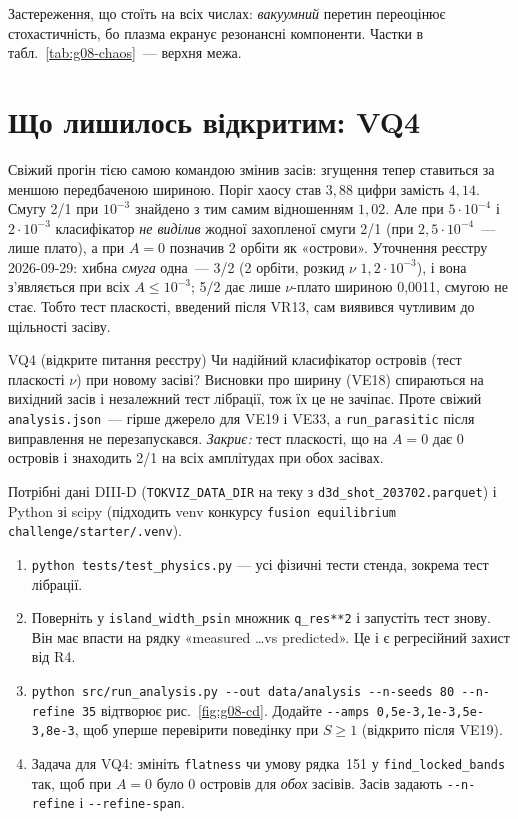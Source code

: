 Застереження, що стоїть на всіх числах: \emph{вакуумний} перетин переоцінює стохастичність, бо
плазма екранує резонансні компоненти. Частки в табл.~\ref{tab:g08-chaos}~--- верхня межа.

\section{Що лишилось відкритим: VQ4}\label{sec:g08-vq4}

Свіжий прогін тією самою командою змінив засів: згущення тепер ставиться за меншою
передбаченою шириною. Поріг хаосу став $3{,}88$ цифри замість $4{,}14$. Смугу 2/1 при $10^{-3}$
знайдено з тим самим відношенням $1{,}02$. Але при $5\cdot10^{-4}$ і $2\cdot10^{-3}$ класифікатор
\emph{не виділив} жодної захопленої смуги 2/1 (при $2{,}5\cdot10^{-4}$~--- лише плато), а при $A=0$
позначив 2 орбіти як «острови». Уточнення реєстру 2026-09-29: хибна \emph{смуга} одна~--- 3/2
(2 орбіти, розкид $\nu$ $1{,}2\cdot10^{-3}$), і вона з'являється при всіх $A\le10^{-3}$; 5/2 дає
лише $\nu$-плато шириною 0,0011, смугою не стає. Тобто тест пласкості, введений після VR13, сам
виявився чутливим до щільності засіву.

\begin{conjecture}{VQ4 (відкрите питання реєстру)}
Чи надійний класифікатор островів (тест пласкості $\nu$) при новому засіві? Висновки про ширину
(VE18) спираються на вихідний засів і незалежний тест лібрації, тож їх це не зачіпає. Проте
свіжий \texttt{analysis.json}~--- гірше джерело для VE19 і VE33, а \texttt{run\_parasitic}
після виправлення не перезапускався. \emph{Закриє:} тест пласкості, що на $A=0$ дає 0 островів
і знаходить 2/1 на всіх амплітудах при обох засівах.
\end{conjecture}

\begin{practicum}
Потрібні дані DIII-D (\texttt{TOKVIZ\_DATA\_DIR} на теку з \texttt{d3d\_shot\_203702.parquet}) і
Python зі scipy (підходить venv конкурсу \texttt{fusion equilibrium challenge/starter/.venv}).
\begin{enumerate}
\item \verb|python tests/test_physics.py| --- усі фізичні тести стенда, зокрема тест лібрації.
\item Поверніть у \texttt{island\_width\_psin} множник \verb|q_res**2| і запустіть тест знову. Він
      має впасти на рядку «measured \ldots vs predicted». Це і є регресійний захист від R4.
\item \verb|python src/run_analysis.py --out data/analysis --n-seeds 80 --n-refine 35| відтворює
      рис.~\ref{fig:g08-cd}. Додайте \verb|--amps 0,5e-3,1e-3,5e-3,8e-3|, щоб уперше перевірити
      поведінку при $S\ge1$ (відкрито після VE19).
\item Задача для VQ4: змініть \texttt{flatness} чи умову рядка~151 у \texttt{find\_locked\_bands}
      так, щоб при $A=0$ було 0 островів для \emph{обох} засівів. Засів задають
      \verb|--n-refine| і \verb|--refine-span|.
\end{enumerate}
\end{practicum}

